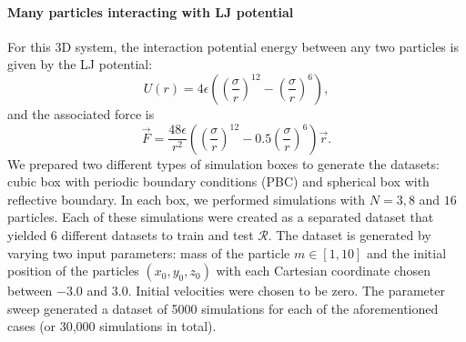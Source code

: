 \documentclass[aps,prl,twocolumn,superscriptaddress,tightenlines,longbibliography, reprint]{revtex4-1}
\newcommand{\R}{$\mathscr{R}$}
\begin{document}
\paragraph{Many particles interacting with LJ potential}
For this 3D system, the interaction potential energy between any two particles is given by the LJ potential:
\begin{equation} \label{eq:data11}
U(r) = 4\epsilon \left(\left(\frac{\sigma}{r}\right)^{12} - \left(\frac{\sigma}{r}\right)^{6}\right),
\end{equation}
and the associated force is
\begin{equation} \label{eq:data12}
\vec{F} =  \frac{48 \epsilon} {r^2} \left(\left(\frac{\sigma}{r}\right)^{12} - 0.5 \left(\frac{\sigma}{r}\right)^6 \right) \vec{r}.
\end{equation}
We prepared two different types of simulation boxes to generate the datasets: cubic box with periodic boundary conditions (PBC) and spherical box with reflective boundary. In each box, we performed simulations with $N=3, 8$ and $16$ particles. Each of these simulations were created as a separated dataset that yielded 6 different datasets to train and test \R. The dataset is generated by varying two input parameters: mass of the particle $m \in [1, 10]$ and the initial position of the particles  $(x_0, y_0, z_0)$ with each Cartesian coordinate chosen between $-3.0$ and $3.0$. Initial velocities were chosen to be zero. The parameter sweep generated a dataset of 5000 simulations for each of the aforementioned cases (or 30,000 simulations in total). 
\end{document}
